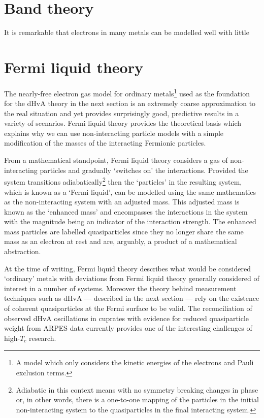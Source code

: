 
\section{Band theory}
    \label{Sec:Theo:BandTheory}

It is remarkable that electrons in many metals can be modelled well with little 

\section{Fermi liquid theory}
    \label{Sec:Theo:FermiLiquidTheory}

The nearly-free electron gas model for ordinary metals\footnote{A model which only considers the kinetic energies of the electrons and Pauli exclusion terms.} used as the foundation for the \ac{dHvA} theory in the next section is an extremely coarse approximation to the real situation and yet provides surprisingly good, predictive results in a variety of scenarios. Fermi liquid theory provides the theoretical basis which explains why we can use non-interacting particle models with a simple modification of the masses of the interacting Fermionic particles.

From a mathematical standpoint, Fermi liquid theory considers a gas of non-interacting particles and gradually `switches on' the interactions. Provided the system transitions adiabatically\footnote{Adiabatic in this context means with no symmetry breaking changes in phase or, in other words, there is a one-to-one mapping of the particles in the initial non-interacting system to the quasiparticles in the final interacting system.} then the `particles' in the resulting system, which is known as a `Fermi liquid', can be modelled using the same mathematics as the non-interacting system with an adjusted mass. This adjusted mass is known as the `enhanced mass' and encompasses the interactions in the system with the magnitude being an indicator of the interaction strength. The enhanced mass particles are labelled quasiparticles since they no longer share the same mass as an electron at rest and are, arguably, a product of a mathematical abstraction.

At the time of writing, Fermi liquid theory describes what would be considered `ordinary' metals with deviations from Fermi liquid theory generally considered of interest in a number of systems. Moreover the theory behind measurement techniques such as \ac{dHvA} --- described in the next section --- rely on the existence of coherent quasiparticles at the Fermi surface to be valid. The reconciliation of observed \ac{dHvA} oscillations in cuprates with evidence for reduced quasiparticle weight from \ac{ARPES} data currently provides one of the interesting challenges of high-$T_c$ research.

